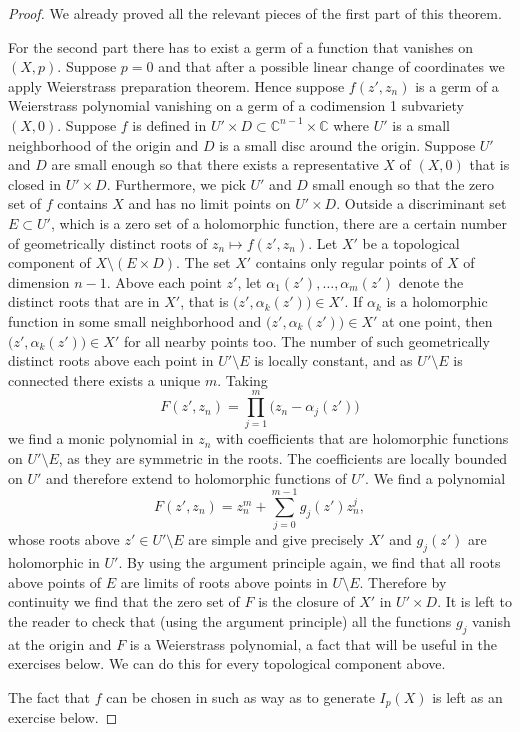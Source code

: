 \documentclass[12pt,openany]{book}
\newcommand{\C}{{\mathbb{C}}}
\theoremstyle{plain}
\theoremstyle{remark}
\theoremstyle{definition}
\theoremstyle{exercise}
\theoremstyle{example}
\begin{document}
\begin{proof}
We already proved all the relevant pieces of the first part of this
theorem.

For the second part there has to exist a germ of a function that vanishes on
$(X,p)$.  Suppose $p=0$ and that after a possible linear
change of coordinates we apply Weierstrass preparation theorem.  Hence
suppose $f(z',z_n)$ is a germ of a Weierstrass
polynomial vanishing on a germ of a codimension 1 subvariety $(X,0)$.
Suppose $f$ is defined in $U' \times D \subset \C^{n-1} \times \C$ where $U'$ is a small neighborhood
of the origin and $D$ is a small disc around the origin.
Suppose $U'$ and $D$ are small enough so that there exists a 
representative $X$ of $(X,0)$ that is closed in $U' \times D$.
Furthermore, we pick $U'$ and $D$ small enough so that the zero set of $f$
contains $X$ and has no limit points on $U' \times D$.
Outside a discriminant set $E \subset U'$, which is a zero set of a
holomorphic function, there are a certain number of geometrically
distinct roots of $z_n \mapsto f(z',z_n)$.  Let $X'$ be a topological component of $X \setminus ( E
\times D )$.  The set $X'$ contains only regular points of $X$ of
dimension $n-1$.
Above each point $z'$, let 
$\alpha_1(z'),\ldots,\alpha_m(z')$ denote the distinct roots that are in $X'$,
that is $\bigl(z',\alpha_k(z')\bigr) \in X'$.
If $\alpha_k$ is a holomorphic function in some small neighborhood and
$\bigl(z',\alpha_k(z')\bigr) \in X'$ at one point, then 
$\bigl(z',\alpha_k(z')\bigr) \in X'$ for all nearby points too.
The number of
such geometrically distinct roots above each point in
$U' \setminus E$ is locally constant, and as $U' \setminus E$ is connected
there exists a unique $m$.  Taking
\begin{equation*}
F(z',z_n) = \prod_{j=1}^m \bigl( z_n-\alpha_j(z')\bigr)
\end{equation*}
we find a monic polynomial in $z_n$ with coefficients that are holomorphic
functions on $U' \setminus E$, as they are symmetric in the roots.
The coefficients are locally bounded
on $U'$ and therefore extend to holomorphic functions of $U'$.  We find
a polynomial
\begin{equation*}
F(z',z_n) = z_n^m + \sum_{j=0}^{m-1} g_j(z') z_n^j ,
\end{equation*}
whose roots
above $z' \in U' \setminus E$
are simple and give precisely $X'$
and $g_j(z')$ are holomorphic in $U'$. 
By using the argument principle
again, we find that all roots above points of $E$ are limits of roots
above points in $U \setminus E$.
Therefore by continuity we find that
the zero set of $F$ is the closure of $X'$ in $U' \times D$.
It is left to the reader to check that (using the argument principle)
all the functions $g_j$ vanish at the origin and $F$ is a Weierstrass
polynomial, a fact that will be useful in the exercises below.
We can do this for every topological component above.

The fact that $f$ can be chosen in such as way as to generate $I_p(X)$
is left as an exercise below.
\end{proof}
\end{document}
